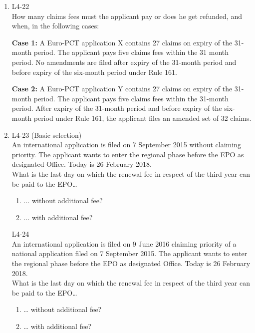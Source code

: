 \documentclass{report}
\begin{document}
\begin{enumerate}[label=\textbf{Question \arabic*}]
\begin{enumerate}[label=\textbf{Question \arabic*}]
    \item %
    L4-22 \\
    How many claims fees must the applicant pay or does he get refunded, and when, in the following cases:
    
    \vspace{1em}
    \textbf{Case 1:} A Euro-PCT application X contains 27 claims on expiry of the 31-month period. The applicant pays five claims fees within the 31 month period. No amendments are filed after expiry of the 31-month period and before expiry of the six-month period under Rule 161.
    
    \vspace{1em}
    \textbf{Case 2:} A Euro-PCT application Y contains 27 claims on expiry of the 31-month period. The applicant pays five claims fees within the 31-month period. After expiry of the 31-month period and before expiry of the six-month period under Rule 161, the applicant files an amended set of 32 claims.

    \item %
    L4-23 (Basic selection) \\
    An international application is filed on 7 September 2015 without claiming priority. The applicant wants to enter the regional phase before the EPO as designated Office. Today is 26 February 2018. \\
    What is the last day on which the renewal fee in respect of the third year can be paid to the EPO…
    \begin{enumerate}[label=(\alph*)]
        \item ... without additional fee?
        \item ... with additional fee?
    \end{enumerate}

    \vspace{1em}
    L4-24 \\
    An international application is filed on 9 June 2016 claiming priority of a national application filed on 7 September 2015. The applicant wants to enter the regional phase before the EPO as designated Office. Today is 26 February 2018. \\
    What is the last day on which the renewal fee in respect of the third year can be paid to the EPO…
    \begin{enumerate}[label=(\alph*), resume]
        \item … without additional fee?
        \item … with additional fee?
    \end{enumerate}


\end{enumerate}
\end{enumerate}
\end{document}
